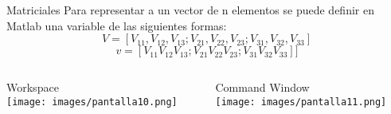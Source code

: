 \documentclass{bredelebeamer}
\begin{document}
\begin{frame}{Matriciales}
Para representar a un vector de n elementos se puede definir en Matlab una variable de las siguientes formas:
\begin{equation*}
V = [V_{11},V_{12},V_{13} ; V_{21},V_{22},V_{23} ; V_{31},V_{32},V_{33}]
\end{equation*}
\begin{equation*}
v = [V_{11} V_{12} V_{13} ; V_{21} V_{22} V_{23} ; V_{31} V_{32} V_{33}]]
\end{equation*}
\begin{columns}
\begin{column}{0.5\textwidth}
\begin{center}
Workspace\\
\texttt{[image: images/pantalla10.png]}
\end{center}
\end{column}
\begin{column}{0.5\textwidth}
\begin{center}
Command Window\\
\texttt{[image: images/pantalla11.png]}
\end{center}
\end{column}
\end{columns}
\end{frame}
\end{document}
